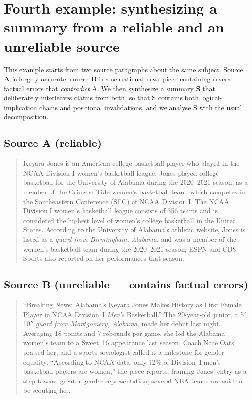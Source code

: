 \documentclass[11pt]{article}
\begin{document}
\section{Fourth example: synthesizing a summary from a reliable and an
unreliable source}

This example starts from two source paragraphs about the same subject. Source
\textbf{A} is largely accurate; source \textbf{B} is a sensational news piece
containing several factual errors that \emph{contradict} A. We then synthesize a
summary \textbf{S} that deliberately interleaves claims from both, so that S
contains both logical-implication chains and positional invalidations, and we
analyse S with the usual decomposition.

\subsection*{Source A (reliable)}
\begin{quote}\small
Keyara Jones is an American college basketball player who played in the NCAA
Division I women's basketball league. Jones played college basketball for the
University of Alabama during the 2020--2021 season, as a member of the Crimson
Tide women's basketball team, which competes in the Southeastern Conference (SEC)
of NCAA Division I. The NCAA Division I women's basketball league consists of 356
teams and is considered the highest level of women's college basketball in the
United States. According to the University of Alabama's athletic website, Jones
is listed as a \emph{guard from Birmingham, Alabama}, and was a member of the
women's basketball team during the 2020--2021 season; ESPN and CBS Sports also
reported on her performances that season.
\end{quote}

\subsection*{Source B (unreliable --- contains factual errors)}
\begin{quote}\small
``Breaking News: Alabama's Keyara Jones Makes History as First Female Player in
NCAA Division~I \emph{Men's} Basketball.'' The 20-year-old junior, a 5$'$10$''$
\emph{guard from Montgomery, Alabama}, made her debut last night. Averaging 18
points and 7 rebounds per game, she led the Alabama women's team to a Sweet~16
appearance last season. Coach Nate Oats praised her, and a sports sociologist
called it a milestone for gender equality. ``According to NCAA data, only 12\% of
Division~I men's basketball players are women,'' the piece reports, framing
Jones' entry as a step toward greater gender representation; several NBA teams
are said to be scouting her.
\end{quote}
\end{document}
